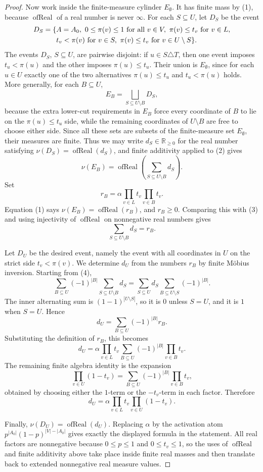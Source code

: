 \begin{proof}
Now work inside the finite-measure cylinder \(E_\emptyset\).  It has finite
mass by (1), because \(\operatorname{ofReal}\) of a real number is never
\(\infty\).  For each \(S\subseteq U\), let \(D_S\) be the event
\[
\begin{aligned}
D_S=\{&A=A_0,\ 0\le\pi(v)\le1\hbox{ for all }v\in V,\ 
        \pi(v)\le t_v\hbox{ for }v\in L,\\
     &t_v<\pi(v)\hbox{ for }v\in S,\ 
        \pi(v)\le t_v\hbox{ for }v\in U\setminus S\}.
\end{aligned}
\]
The events \(D_S\), \(S\subseteq U\), are pairwise disjoint: if
\(u\in S\triangle T\), then one event imposes \(t_u<\pi(u)\) and the other
imposes \(\pi(u)\le t_u\).  Their union is \(E_\emptyset\), since for each
\(u\in U\) exactly one of the two alternatives
\(\pi(u)\le t_u\) and \(t_u<\pi(u)\) holds.  More generally, for each
\(B\subseteq U\),
\[
E_B=\bigsqcup_{S\subseteq U\setminus B}D_S,
\tag{2}
\]
because the extra lower-cut requirements in \(E_B\) force every coordinate of
\(B\) to lie on the \(\pi(u)\le t_u\) side, while the remaining coordinates
of \(U\setminus B\) are free to choose either side.  Since all these sets are
subsets of the finite-measure set \(E_\emptyset\), their measures are finite.
Thus we may write \(d_S\in\mathbb R_{\ge0}\) for the real number satisfying
\(\nu(D_S)=\operatorname{ofReal}(d_S)\), and finite additivity applied to
(2) gives
\[
\nu(E_B)=\operatorname{ofReal}\!\left(\sum_{S\subseteq U\setminus B}d_S\right).
\tag{3}
\]
Set
\[
r_B=\alpha\prod_{v\in L}t_v\prod_{v\in B}t_v .
\]
Equation (1) says \(\nu(E_B)=\operatorname{ofReal}(r_B)\), and \(r_B\ge0\).
Comparing this with (3) and using injectivity of
\(\operatorname{ofReal}\) on nonnegative real numbers gives
\[
\sum_{S\subseteq U\setminus B}d_S=r_B.
\tag{4}
\]

Let \(D_U\) be the desired event, namely the event with all coordinates in
\(U\) on the strict side \(t_v<\pi(v)\).  We determine \(d_U\) from the
numbers \(r_B\) by finite Möbius inversion.  Starting from (4),
\[
\sum_{B\subseteq U}(-1)^{|B|}
  \sum_{S\subseteq U\setminus B}d_S
=
\sum_{S\subseteq U}d_S
  \sum_{B\subseteq U\setminus S}(-1)^{|B|}.
\]
The inner alternating sum is \((1-1)^{|U\setminus S|}\), so it is \(0\) unless
\(S=U\), and it is \(1\) when \(S=U\).  Hence
\[
d_U=
\sum_{B\subseteq U}(-1)^{|B|}r_B.
\tag{5}
\]
Substituting the definition of \(r_B\), this becomes
\[
d_U=
\alpha\prod_{v\in L}t_v
\sum_{B\subseteq U}(-1)^{|B|}\prod_{v\in B}t_v.
\]
The remaining finite algebra identity is the expansion
\[
\prod_{v\in U}(1-t_v)
=\sum_{B\subseteq U}(-1)^{|B|}\prod_{v\in B}t_v,
\]
obtained by choosing either the \(1\)-term or the \(-t_v\)-term in each
factor.  Therefore
\[
d_U=\alpha\prod_{v\in L}t_v\prod_{v\in U}(1-t_v).
\]

Finally, \(\nu(D_U)=\operatorname{ofReal}(d_U)\).  Replacing \(\alpha\) by
the activation atom
\(p^{|A_0|}(1-p)^{|V|-|A_0|}\) gives exactly the displayed formula in the
statement.  All real factors are nonnegative because \(0\le p\le1\) and
\(0\le t_v\le1\), so the uses of \(\operatorname{ofReal}\) and finite
additivity above take place inside finite real masses and then translate back
to extended nonnegative real measure values.
\end{proof}
